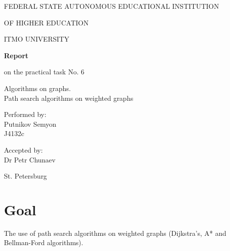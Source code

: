 \documentclass[a4paper,article,14pt]{extarticle}
\begin{document}
	\begin{titlepage}
		\begin{center}
			FEDERAL STATE AUTONOMOUS EDUCATIONAL INSTITUTION
			
			OF HIGHER EDUCATION
			
			ITMO UNIVERSITY
			\vspace{3cm}
			
			\large\textbf{Report}
			
			\large on the practical task No. 6
			
			\large \flqq Algorithms on graphs. \\ Path search algorithms on weighted graphs\frqq
			\vspace{5cm}
			

			\begin{flushright}
				{Performed by:} \\
				Putnikov Semyon \\ 
				J4132c \\
			\end{flushright}
			
			
			\begin{flushright}
				{Accepted by:} \\
				Dr Petr Chunaev \\ 
			\end{flushright}
			\vfill
			
			{St. Petersburg}
			\par{\number\year}
		\end{center}
	\end{titlepage}

	\newpage
	
	\section{Goal}
	The use of path search algorithms on weighted graphs (Dijkstra's, A* and Bellman-Ford algorithms).
	
\end{document}
